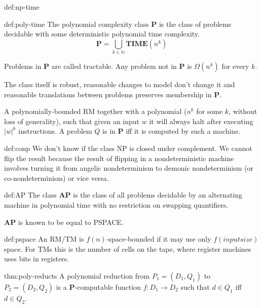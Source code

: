 \documentclass[landscape, 8pt]{extarticle}
\begin{document}
\begin{multicols}{3}
\begin{dfn}{def:np-time}{}
\end{dfn}


\begin{dfn}{def:poly-time}{}
The polynomial complexity class \textbf{P} is the class of problems decidable with some deterministic polynomial time complexity.
\[\textbf{P} = \bigcup_{k \in \mathbb{N}} \textbf{TIME}(n^k)\]

Problems in \textbf{P} are called tractable. Any problem not in \textbf{P} is $\Omega(n^k)$ for every $k$.

The class itself is robust, reasonable changes to model don't change it and reasonable translations between problems preserves membership in \textbf{P}.

A polynomially-bounded RM together with a polynomial ($n^k$ for some $k$, without loss of generality), such that given an input $w$ it will always halt after executing $|w|^k$ instructions. A problem $Q$ is in \textbf{P} iff it is computed by such a machine.
\end{dfn}


\begin{dfn}[CoNP]{def:conp}{}
We don't know if the class NP is closed under complement. We cannot flip the result because the result of flipping in a nondeterministic machine involves turning it from angelic nondeterminism to demonic nondeterminism (or co-nondeterminism) or vice versa.
\end{dfn}

\begin{dfn}{def:AP}{}
The class \textbf{AP} is the class of all problems decidable by an alternating machine in polynomial time with no restriction on swapping quantifiers.

\textbf{AP} is known to be equal to PSPACE.
\end{dfn}

\begin{dfn}{def:pspace}{}
An RM/TM is $f(n)$-space-bounded if it may use only $f(inputsize)$ space. For TMs this is the number of cells on the tape, where register machines uses bits in registers.

\end{dfn}




\begin{thm}{thm:poly-reducts}{}
A polynomial reduction from $P_1 = (D_1, Q_1)$ to $P_2 = (D_2, Q_2)$ is a \textbf{P}-computable function $f : D_1 \to D_2$ such that $d \in Q_1$ iff $d \in Q_2$.


\end{thm}
\end{multicols}
\end{document}
